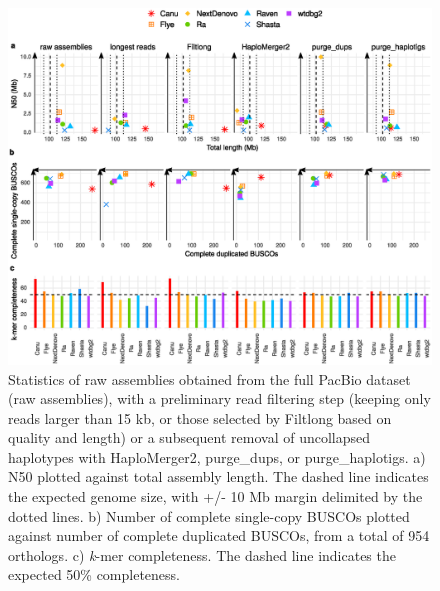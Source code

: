 \begin{suppsection}
   \begin{figure}[ht]
    \centering
     \includegraphics[width=13.5cm]{fig/benchmark/pacbio_all_v20210317.eps}
   \caption{Statistics of raw assemblies obtained from the full PacBio dataset (raw assemblies), with a preliminary read filtering step (keeping only reads larger than 15 kb, or those selected by Filtlong based on quality and length) or a subsequent removal of uncollapsed haplotypes with HaploMerger2, purge\_dups, or purge\_haplotigs. a) N50 plotted against total assembly length. The dashed line indicates the expected genome size, with +/- 10 Mb margin delimited by the dotted lines. b) Number of complete single-copy BUSCOs plotted against number of complete duplicated BUSCOs, from a total of 954 orthologs. c) \textit{k}-mer completeness. The dashed line indicates the expected 50\% completeness.}
   \label{fig:pacbio_full_stats}
 \end{figure}
 

\end{suppsection}
